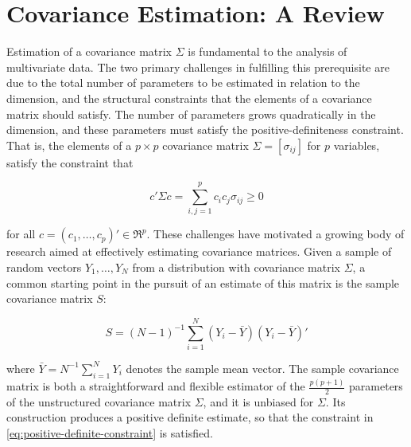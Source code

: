 

\chapter{Covariance Estimation: A Review} \label{background-review-chapter}

\indent

Estimation of a  covariance matrix $\Sigma$ is fundamental to the analysis of multivariate data. The two primary challenges in fulfilling this prerequisite are due to the total number of parameters to be estimated in relation to the dimension, and the structural constraints that the elements of a covariance matrix should satisfy. The number of parameters grows quadratically in the dimension, and these parameters must satisfy the positive-definiteness constraint. That is, the elements of a $p \times p$ covariance matrix $\Sigma = \left[ \sigma_{ij} \right]$ for $p$ variables, satisfy the constraint that 

\begin{equation} \label{eq:positive-definite-constraint} 
c'\Sigma c = \sum_{i,j = 1}^p c_i c_j \sigma_{ij} \ge 0
\end{equation} 

\noindent
for all $c = \left(c_1,\dots, c_p \right)' \in \Re^p$. These challenges have motivated a growing body of research aimed at effectively estimating covariance matrices. Given a sample of random vectors $Y_1,\dots, Y_N$ from a distribution with covariance matrix $\Sigma$, a common starting point in the pursuit of an estimate of this matrix is the sample covariance matrix $S$:

\begin{equation} \label{eq:sample-covariance-matrix}
S = \left(N-1\right)^{-1} \sum_{i = 1}^N \left(Y_i - \bar{Y}\right)\left(Y_i - \bar{Y}\right)'
\end{equation}

\noindent
where $\bar{Y} = N^{-1}\sum_{i=1}^N Y_i$ denotes the sample mean vector. The sample covariance matrix is both a straightforward and flexible estimator of the $\frac{p\left(p+1\right)}{2}$ parameters of the unstructured covariance matrix $\Sigma$, and it is unbiased for $\Sigma$. Its construction produces a positive definite estimate, so that the constraint in \eqref{eq:positive-definite-constraint} is satisfied. 

\bigskip

